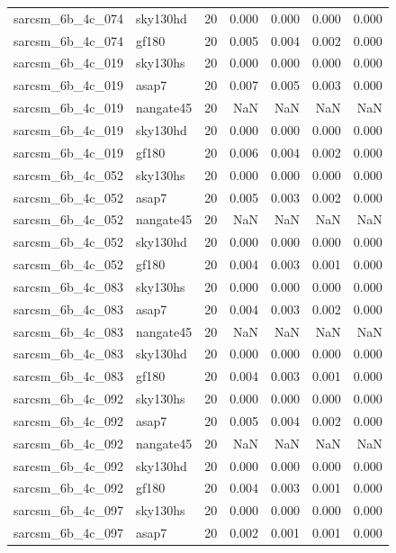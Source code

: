 \begin{tabular}{llrrrrr}
sarcsm\_6b\_4c\_074 & sky130hd & 20 & 0.000 & 0.000 & 0.000 & 0.000 \\
sarcsm\_6b\_4c\_074 & gf180 & 20 & 0.005 & 0.004 & 0.002 & 0.000 \\
sarcsm\_6b\_4c\_019 & sky130hs & 20 & 0.000 & 0.000 & 0.000 & 0.000 \\
sarcsm\_6b\_4c\_019 & asap7 & 20 & 0.007 & 0.005 & 0.003 & 0.000 \\
sarcsm\_6b\_4c\_019 & nangate45 & 20 & NaN & NaN & NaN & NaN \\
sarcsm\_6b\_4c\_019 & sky130hd & 20 & 0.000 & 0.000 & 0.000 & 0.000 \\
sarcsm\_6b\_4c\_019 & gf180 & 20 & 0.006 & 0.004 & 0.002 & 0.000 \\
sarcsm\_6b\_4c\_052 & sky130hs & 20 & 0.000 & 0.000 & 0.000 & 0.000 \\
sarcsm\_6b\_4c\_052 & asap7 & 20 & 0.005 & 0.003 & 0.002 & 0.000 \\
sarcsm\_6b\_4c\_052 & nangate45 & 20 & NaN & NaN & NaN & NaN \\
sarcsm\_6b\_4c\_052 & sky130hd & 20 & 0.000 & 0.000 & 0.000 & 0.000 \\
sarcsm\_6b\_4c\_052 & gf180 & 20 & 0.004 & 0.003 & 0.001 & 0.000 \\
sarcsm\_6b\_4c\_083 & sky130hs & 20 & 0.000 & 0.000 & 0.000 & 0.000 \\
sarcsm\_6b\_4c\_083 & asap7 & 20 & 0.004 & 0.003 & 0.002 & 0.000 \\
sarcsm\_6b\_4c\_083 & nangate45 & 20 & NaN & NaN & NaN & NaN \\
sarcsm\_6b\_4c\_083 & sky130hd & 20 & 0.000 & 0.000 & 0.000 & 0.000 \\
sarcsm\_6b\_4c\_083 & gf180 & 20 & 0.004 & 0.003 & 0.001 & 0.000 \\
sarcsm\_6b\_4c\_092 & sky130hs & 20 & 0.000 & 0.000 & 0.000 & 0.000 \\
sarcsm\_6b\_4c\_092 & asap7 & 20 & 0.005 & 0.004 & 0.002 & 0.000 \\
sarcsm\_6b\_4c\_092 & nangate45 & 20 & NaN & NaN & NaN & NaN \\
sarcsm\_6b\_4c\_092 & sky130hd & 20 & 0.000 & 0.000 & 0.000 & 0.000 \\
sarcsm\_6b\_4c\_092 & gf180 & 20 & 0.004 & 0.003 & 0.001 & 0.000 \\
sarcsm\_6b\_4c\_097 & sky130hs & 20 & 0.000 & 0.000 & 0.000 & 0.000 \\
sarcsm\_6b\_4c\_097 & asap7 & 20 & 0.002 & 0.001 & 0.001 & 0.000 \\

\end{tabular}
